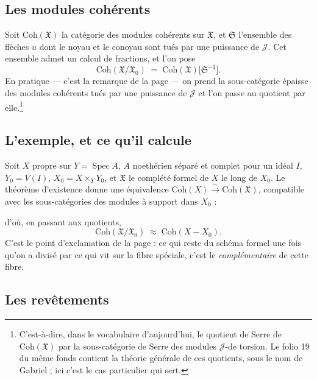 \documentclass[11pt,a4paper]{article}
\begin{document}
\subsection*{Les modules cohérents}

Soit $\mathrm{Coh}(\mathfrak{X})$ la catégorie des modules cohérents sur
$\mathfrak{X}$, et $\mathfrak{S}$ l'ensemble des flèches $u$ dont le noyau et
le conoyau sont tués par une puissance de $\mathcal{J}$. Cet ensemble admet un
calcul de fractions, et l'on pose
\[
  \mathrm{Coh}(\mathfrak{X}/\mathfrak{X}_{0}) \;=\;
  \mathrm{Coh}(\mathfrak{X})\bigl[\mathfrak{S}^{-1}\bigr] .
\]
En pratique --- c'est la remarque de la page --- on prend la sous-catégorie
épaisse des modules cohérents tués par une puissance de $\mathcal{J}$ et l'on
passe au quotient par elle.\footnote{C'est-à-dire, dans le vocabulaire
d'aujourd'hui, le quotient de Serre de $\mathrm{Coh}(\mathfrak{X})$ par la
sous-catégorie de Serre des modules $\mathcal{J}$-de torsion. Le folio 19 du
même fonds contient la théorie générale de ces quotients, sous le nom de
Gabriel ; ici c'est le cas particulier qui sert.}

\subsection*{L'exemple, et ce qu'il calcule}

Soit $X$ propre sur $Y = \operatorname{Spec} A$, $A$ noethérien séparé et
complet pour un idéal $I$, $Y_{0} = V(I)$, $X_{0} = X \times_{Y} Y_{0}$, et
$\mathfrak{X}$ le complété formel de $X$ le long de $X_{0}$. Le théorème
d'existence donne une équivalence
$\mathrm{Coh}(X) \xrightarrow{\ \sim\ } \mathrm{Coh}(\mathfrak{X})$, compatible
avec les sous-catégories des modules à support dans $X_{0}$ :


d'où, en passant aux quotients,
\[
  \mathrm{Coh}(\mathfrak{X}/\mathfrak{X}_{0}) \;\approx\;
  \mathrm{Coh}(X - X_{0}) .
\]
C'est le point d'exclamation de la page : ce qui reste du schéma formel une
fois qu'on a divisé par ce qui vit sur la fibre spéciale, c'est le
\emph{complémentaire} de cette fibre.

\subsection*{Les revêtements}
\end{document}
